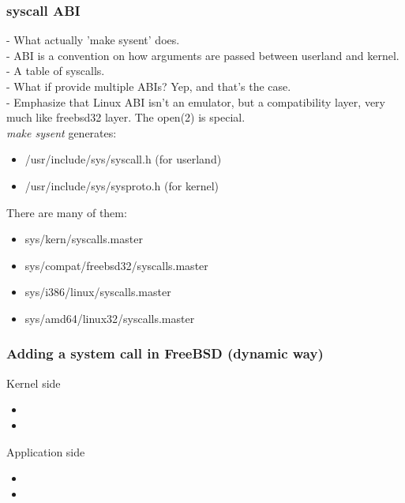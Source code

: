 \documentclass{beamer}
\begin{document}
\begin{frame}
\frametitle{syscall ABI}
 {
	- What actually 'make sysent' does.\\
	- ABI is a convention on how arguments are passed between userland
	  and kernel.\\
	- A table of syscalls.\\
	- What if provide multiple ABIs? Yep, and that's the case.\\
	- Emphasize that Linux ABI isn't an emulator, but a compatibility
	  layer, very much like freebsd32 layer. The open(2) is special.\\
}
\emph{make sysent} generates:
\begin{itemize}
  \item /usr/include/sys/syscall.h (for userland)
  \item /usr/include/sys/sysproto.h (for kernel)
\end{itemize}

 {
  There are many of them:
  \begin{itemize}
  \item sys/kern/syscalls.master
  \item sys/compat/freebsd32/syscalls.master
  \item sys/i386/linux/syscalls.master
  \item sys/amd64/linux32/syscalls.master
  \color{Agrey}{
  \item sys/compat/svr4/syscalls.master
  \item sys/i386/ibcs2/syscalls.master
  }
  \end{itemize}
}
\end{frame}


\begin{frame}[fragile]
\frametitle{Adding a system call in FreeBSD (dynamic way)}
\note {
}
\begin{itemize}
  \begin{item}Kernel side
    \begin{itemize}
      \item {}
      \item {}
    \end{itemize}
  \end{item}
  \begin{item}Application side
    \begin{itemize}
      \item {}
      \item {}
    \end{itemize}
  \end{item}
\end{itemize}
\end{frame}
\end{document}

